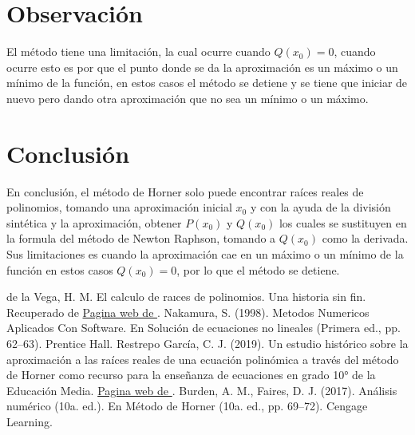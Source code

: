 \documentclass[12pt]{article}
\begin{document}
		\section*{\centering Observación}\label{sec:Observacion}
			El método tiene una limitación, la cual ocurre cuando $ Q(x_0) = 0 $, cuando ocurre esto es por 
			que el punto donde se da la aproximación es un máximo o un mínimo de la función, en estos casos 
			el método se detiene y se tiene que iniciar de nuevo pero dando otra aproximación que no sea un 
			mínimo o un máximo.

		\section*{\centering Conclusión}\label{sec:Conclusion}
			En conclusión, el método de Horner solo puede encontrar raíces reales de polinomios, tomando 
			una aproximación inicial $ x_0 $ y con la ayuda de la división sintética y la aproximación, 
			obtener $ P(x_0) $ y $ Q(x_0) $ los cuales se sustituyen en la formula del método de Newton Raphson, 
			tomando a $Q(x_0) $ como la derivada. \\
			Sus limitaciones es cuando la aproximación cae en un máximo o un mínimo de la función en estos casos 
			$ Q(x_0) = 0 $, por lo que el método se detiene.

		\centering
		\begin{thebibliography}{10}
			 de la Vega, H. M. El calculo de raıces de polinomios. Una historia sin fin. Recuperado de
							\href{http://www.matedu.cinvestav.mx/~elcalculoysuensenanza/investigacion/articulosPDF/Madrid.pdf}{Pagina web de \cite{bib:item1}}.
			 Nakamura, S. (1998). Metodos Numericos Aplicados Con Software. En Solución de ecuaciones no lineales (Primera ed., pp. 62–63). Prentice Hall.
			 Restrepo García, C. J. (2019). Un estudio histórico sobre la aproximación a las raíces reales de una ecuación polinómica a través del método 
							de Horner como recurso para la enseñanza de ecuaciones en grado 10° de la Educación Media.
							\href{https://bibliotecadigital.univalle.edu.co/bitstream/handle/10893/21225/CB%200525927-3487.pdf?sequence=1&isAllowed=y}{Pagina web de \cite{bib:item3}}.
				Burden, A. M., Faires, D. J. (2017). Análisis numérico (10a. ed.). En Método de Horner (10a. ed., pp. 69–72). Cengage Learning.
		\end{thebibliography}

	
\end{document}
